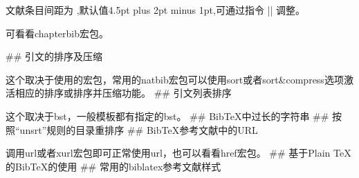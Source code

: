 
文献条目间距为 ,默认值4.5pt plus 2pt minus
1pt,可通过指令 |\addtolength{\itemsep}{距离}| 调整。



可看看chapterbib宏包。 

\#\# 引文的排序及压缩

这个取决于使用的宏包，常用的natbib宏包可以使用sort或者sort\&compress选项激活相应的排序或排序并压缩功能。
\#\# 引文列表排序

这个取决于bst，一般模板都有指定的bst。 \#\# BibTeX中过长的字符串 \#\#
按照``unsrt''规则的目录重排序 \#\# BibTeX参考文献中的URL

调用url或者xurl宏包即可正常使用url，也可以看看href宏包。 \#\# 基于Plain
TeX的BibTeX的使用 \#\# 常用的biblatex参考文献样式

